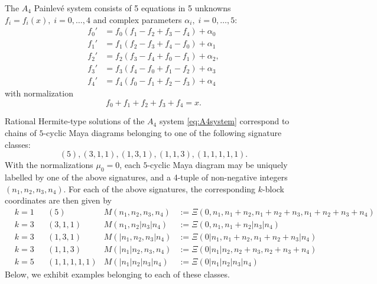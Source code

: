 \documentclass{amsart}
\theoremstyle{definition}
\begin{document}
The $A_4$  Painlev\'e system consists of 5  equations in 5 unknowns $f_i=f_i(x),\; i=0,\ldots, 4$ and complex parameters $\alpha_i,\;i=0,\ldots, 5$:
\begin{equation}\label{eq:A4system}
  \begin{aligned}
    f_0' &= f_0(f_1-f_2+f_3-f_4) + \alpha_0\\
    f_1' &= f_1(f_2-f_3+f_4-f_0) + \alpha_1 \\
    f_2' &= f_2(f_3-f_4+f_0-f_1) + \alpha_2, \\
    f_3' &= f_3(f_4-f_0+f_1-f_2) + \alpha_3 \\
    f_4' &= f_4(f_0-f_1+f_2-f_3) + \alpha_4 
  \end{aligned}
\end{equation}
with normalization
\[ f_0+f_1+f_2+f_3+f_4=x.\]

Rational Hermite-type solutions of the $A_4$ system
\eqref{eq:A4system} correspond to chains of $5$-cyclic Maya diagrams
belonging to one of the following signature classes:
\[ (5), (3,1,1), (1,3,1), (1,1,3), (1,1,1,1,1).\]
With the normalizations $\mu_0=0$, each $5$-cyclic Maya diagram may be
uniquely labelled by one of the above signatures, and a 4-tuple of
non-negative integers $(n_1, n_2, n_3, n_4)$.  For each of the above
signatures, the corresponding $k$-block coordinates are then given by
\begin{align*}
  &k=1 & &(5)& M(n_1,n_2,n_3,n_4)&:=\Xi(0,n_1,n_1+n_2, n_1+n_2+n_3,
                 n_1+n_2+n_3+n_4) \\  
  &k=3 & &(3,1,1) & M(n_1,n_2|n_3|n_4)&:=\Xi(0, n_1 , n_1+ n_2 | n_3 | n_4)\\
  &k=3 & &(1,3,1)  &M(|n_1,n_2,n_3|n_4)&:=\Xi(0| n_1, n_1+n_2,
                      n_1+n_2+n_3 | n_4)\\ 
  &k=3 & &(1,1,3)  &M(|n_1|n_2,n_3,n_4)&:=\Xi(0| n_1 | n_2, n_2+n_3,
                      n_2+n_3+n_4 )\\ 
  &k=5 & &(1,1,1,1,1) & M(|n_1|n_2|n_3|n_4)&:=\Xi(0| n_1 | n_2| n_3| n_4)
\end{align*}
Below, we exhibit examples belonging to each of these classes.
\end{document}
